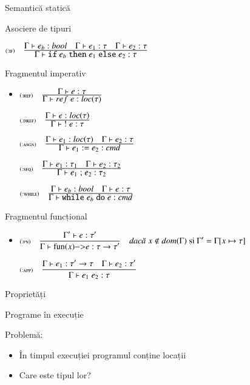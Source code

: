 \begin{section}{Semantică statică}
\begin{subsection}{Asociere de tipuri}
\begin{frame}
\begin{itemize}
\vitem[]
$\reg[:if]{\T{\Gamma}{\Sif e_b \Sthen e_1 \Selse e_2}{\tau}}{\T{\Gamma}{e_b}{bool} \si \T{\Gamma}{e_1}{\tau} \si \T{\Gamma}{e_2}{\tau}}{}$
\end{itemize}
\end{frame}


\begin{frame}
{Fragmentul imperativ}
\begin{itemize}
\item[]
$\reg[:ref]{\T{\Gamma}{\mathrel{ref} e}{loc(\tau)}}{\T{\Gamma}{e}{\tau}}{}$

\vitem[]
$\reg[:dref]{\T{\Gamma}{\mathrel{!} e}{\tau}}{\T{\Gamma}{e}{loc(\tau)}}{}$

\vitem[]
$\reg[:asgn]{\T{\Gamma}{e_1\mathrel{:=} e_2}{cmd}}{\T{\Gamma}{e_1}{loc(\tau)} \si \T{\Gamma}{e_2}{\tau}}{}$

\vitem[]
$\reg[:seq]{\T{\Gamma}{e_1\mathrel{;} e_2}{\tau_2}}{\T{\Gamma}{e_1}{\tau_1} \si \T{\Gamma}{e_2}{\tau_2}}{}$

\vitem[]
$\reg[:while]{\T{\Gamma}{\Swhile e_b \Sdo e}{cmd}}{\T{\Gamma}{e_b}{bool} \si \T{\Gamma}{e}{\tau}}{}$
\end{itemize}
\end{frame}


\begin{frame}{Fragmentul funcțional}
\begin{itemize}
\item[] 
$\displaystyle\reg[:fn]{\T{\Gamma}{\fun{x}{e}}{\tau \rightarrow \tau'}}{\T{\Gamma'}{e}{\tau'}}{x\not\in dom(\Gamma) \mbox{ și } \Gamma' = \Gamma[x\mapsto \tau]}$

\vitem[]
$\displaystyle\reg[:app]{\T{\Gamma}{e_1\; e_2}{\tau}}{\T{\Gamma}{e_1}{\tau' \rightarrow \tau} \si \T{\Gamma}{e_2}{\tau'}}{}$
\end{itemize}
\end{frame}

\end{subsection}

\begin{subsection}{Proprietăți}

\begin{frame}{Programe în execuție}
 \begin{alertblock}{Problemă:}
 \begin{itemize}
   \item În timpul execuției programul conține locații
   \item Care este tipul lor?
 \end{itemize}
 \end{alertblock} 


\end{frame}
\end{subsection}
\end{section}
